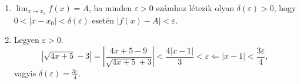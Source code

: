\documentclass[11pt]{scrartcl}
\begin{document}
\begin{enumerate}
	\item $\lim_{x \to x_0} f(x) = A$, ha minden $\varepsilon > 0$ számhoz
	      létezik olyan $\delta(\varepsilon) > 0$, hogy
	      $0 < |x - x_0| < \delta(\varepsilon)$ esetén
	      $|f(x) - A| < \varepsilon$.

	\item Legyen $\varepsilon > 0$.
	      \[
		      \left| \sqrt{4x + 5} - 3 \right|
		      =
		      \left| \frac{4x + 5 - 9}{\sqrt{4x + 5} + 3} \right|
		      <
		      \frac{4|x - 1|}{3}
		      < \varepsilon
		      \Longleftarrow
		      |x - 1| < \frac{3\varepsilon}{4},
	      \]
	      vagyis
	      \(\displaystyle
	      \delta(\varepsilon) = \frac{3\varepsilon}{4}
	      \).
\end{enumerate}
\end{document}
